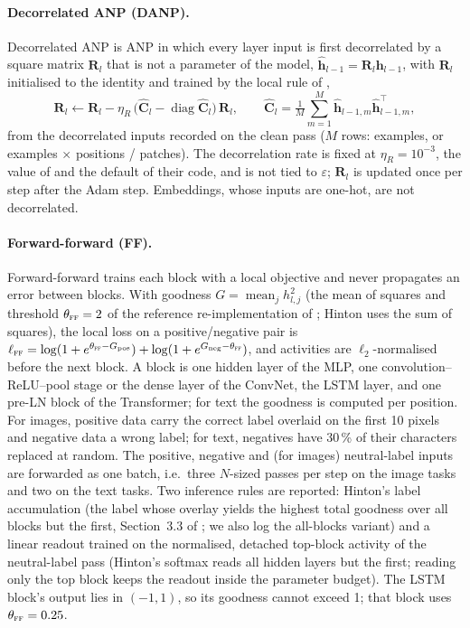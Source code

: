 \documentclass{article}
\newcommand{\method}[1]{\textsc{#1}}
\newcommand{\FF}{\method{ff}}
\newcommand{\bh}{\mathbf{h}}
\newcommand{\bR}{\mathbf{R}}
\newcommand{\bC}{\mathbf{C}}
\begin{document}
\paragraph{Decorrelated ANP (DANP).}
Decorrelated ANP \citep{dalm2023} is ANP in which every layer input is first
decorrelated by a square matrix $\bR_l$ that is not a parameter of the model,
$\hat{\bh}_{l-1}=\bR_l\bh_{l-1}$, with $\bR_l$ initialised to the identity and trained
by the local rule of \citet{ahmad2023constrained},
\begin{equation}
  \bR_l\leftarrow\bR_l-\eta_R\,\bigl(\hat{\bC}_l-\operatorname{diag}\hat{\bC}_l\bigr)\,\bR_l,
  \qquad
  \hat{\bC}_l=\tfrac{1}{M}\textstyle\sum_{m=1}^{M}\hat{\bh}_{l-1,m}\hat{\bh}_{l-1,m}^{\top},
  \label{eq:decor}
\end{equation}
from the decorrelated inputs recorded on the clean pass ($M$ rows: examples, or
examples $\times$ positions / patches). The decorrelation rate is fixed at
$\eta_R=10^{-3}$, the value of \citet{dalm2023} and the default of their code, and is
not tied to $\varepsilon$; $\bR_l$ is updated once per step after the Adam step.
Embeddings, whose inputs are one-hot, are not decorrelated.

\paragraph{Forward-forward (FF).}
Forward-forward \citep{hinton2022} trains each block with a local objective and never
propagates an error between blocks. With goodness $G=\operatorname{mean}_j h_{l,j}^{2}$
(the mean of squares and threshold $\theta_{\FF}=2$ of the reference re-implementation
of \citet{pezeshki2023ff}; Hinton uses the sum of squares), the local loss on a
positive/negative pair is
$\ell_{\FF}=\log(1+e^{\theta_{\FF}-G_{\text{pos}}})+\log(1+e^{G_{\text{neg}}-\theta_{\FF}})$,
and activities are $\ell_2$-normalised before the next block. A block is one hidden
layer of the MLP, one convolution--ReLU--pool stage or the dense layer of the ConvNet,
the LSTM layer, and one pre-LN block of the Transformer; for text the goodness is
computed per position. For images, positive data
carry the correct label overlaid on the first 10 pixels and negative data a wrong label;
for text, negatives have 30\,\% of their characters replaced at random. The positive,
negative and (for images) neutral-label inputs are forwarded as one batch, i.e.\ three
$N$-sized passes per step on the image tasks and two on the text tasks. Two inference
rules are reported: Hinton's label accumulation (the label whose overlay yields the
highest total goodness over all blocks but the first, Section~3.3 of \citet{hinton2022};
we also log the all-blocks variant) and a linear readout trained on the normalised,
detached top-block activity of the neutral-label pass (Hinton's softmax reads all
hidden layers but the first; reading only the top block keeps the readout inside the
parameter budget). The LSTM block's output lies in $(-1,1)$, so its goodness cannot
exceed 1; that block uses $\theta_{\FF}=0.25$.
\end{document}
